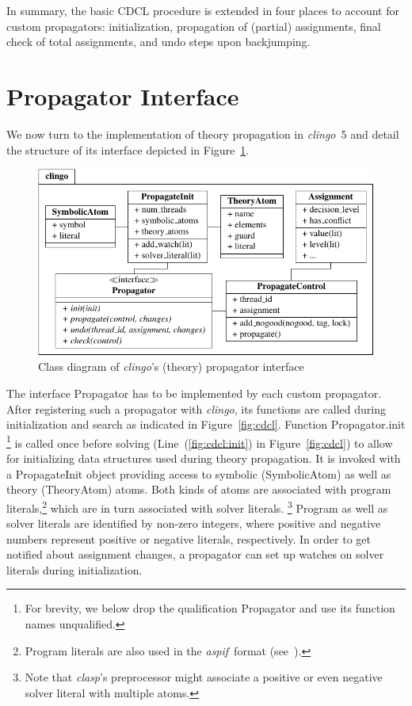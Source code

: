\documentclass[a4paper,USenglish]{oasics-v2016}
\newcommand{\code}[1]{{\ttfamily #1}}
\newcommand{\sysfont}{\textit}
\newcommand{\clasp}{\sysfont{clasp}}
\newcommand{\clingo}{\sysfont{clingo}}
\newcommand{\aspif}{\sysfont{aspif}}
\begin{document}
In summary, the basic CDCL procedure is extended in four places to account for
custom propagators: initialization, propagation of (partial) assignments,
final check of total assignments, and undo steps upon backjumping.

\section{Propagator Interface}\label{sec:system}

We now turn to the implementation of theory propagation in \clingo~5
and detail the structure of its interface depicted in Figure~\ref{fig:interface}.
%
\begin{figure}
  \includegraphics[width=\textwidth]{figures/python-interface}
  \caption{Class diagram of \clingo's (theory) propagator interface\label{fig:interface}}
\end{figure}
%
%
The interface \code{Propagator} has to be implemented by each custom propagator.
After registering such a propagator with \clingo,
its functions are called during initialization and search as indicated %
in Figure~\ref{fig:cdcl}.
%
Function \code{Propagator.init}%
\footnote{For brevity, we below drop the qualification \code{Propagator} and use its function names unqualified.}
is called once before solving (Line~(\ref{fig:cdcl:init}) in Figure~\ref{fig:cdcl})
to allow for initializing data structures used during theory propagation.
It is invoked with a \code{PropagateInit} object providing access to symbolic (\code{SymbolicAtom}) as well as theory (\code{TheoryAtom}) atoms.
Both kinds of atoms are associated with program literals,\footnote{Program literals are also used in the \aspif\ format (see~\cite{gekakaosscwa16b}).} %
which are in turn associated with solver literals.%
\footnote{Note that \clasp's preprocessor might associate a positive or even negative solver literal with multiple atoms.}
Program as well as solver literals are identified by non-zero integers, where positive and negative numbers represent positive or  negative literals, respectively.
In order to get notified about assignment changes, a propagator can set up watches on solver literals during initialization.
\end{document}
